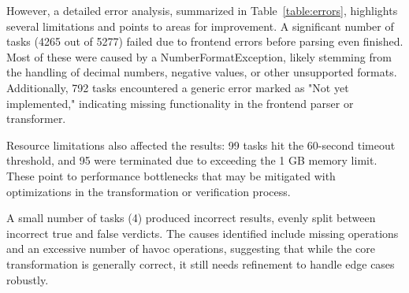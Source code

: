 \begin{table}[h]
\caption{ Summary of errors }
\label{table:errors}
\end{table}

However, a detailed error analysis, summarized in Table~\ref{table:errors}, highlights several limitations and points to areas for improvement. A significant number of tasks (4265 out of 5277) failed due to frontend errors before parsing even finished. Most of these were caused by a NumberFormatException, likely stemming from the handling of decimal numbers, negative values, or other unsupported formats. Additionally, 792 tasks encountered a generic error marked as "Not yet implemented," indicating missing functionality in the frontend parser or transformer.

Resource limitations also affected the results: 99 tasks hit the 60-second timeout threshold, and 95 were terminated due to exceeding the 1 GB memory limit. These point to performance bottlenecks that may be mitigated with optimizations in the transformation or verification process.

A small number of tasks (4) produced incorrect results, evenly split between incorrect true and false verdicts. The causes identified include missing operations and an excessive number of havoc operations, suggesting that while the core transformation is generally correct, it still needs refinement to handle edge cases robustly.

